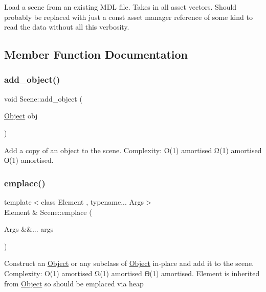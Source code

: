 Load a scene from an existing M\+DL file. Takes in all asset vectors. Should probably be replaced with just a const asset manager reference of some kind to read the data without all this verbosity. 

\subsection{Member Function Documentation}
\mbox{\label{class_scene_a6af6561348957b6ce78e851390bc2d58}} 
\subsubsection{\texorpdfstring{add\+\_\+object()}{add\_object()}}
{\footnotesize\ttfamily void Scene\+::add\+\_\+object (\begin{DoxyParamCaption}\item[{\mbox{\hyperlink{class_object}{Object}}}]{obj }\end{DoxyParamCaption})}

Add a copy of an object to the scene. Complexity\+: O(1) amortised Ω(1) amortised ϴ(1) amortised. \mbox{\label{class_scene_ab49d36bd44583a0374eedf41ccce75d3}} 
\subsubsection{\texorpdfstring{emplace()}{emplace()}}
{\footnotesize\ttfamily template$<$class Element , typename... Args$>$ \\
Element \& Scene\+::emplace (\begin{DoxyParamCaption}\item[{Args \&\&...}]{args }\end{DoxyParamCaption})}

Construct an \mbox{\hyperlink{class_object}{Object}} or any subclass of \mbox{\hyperlink{class_object}{Object}} in-\/place and add it to the scene. Complexity\+: O(1) amortised Ω(1) amortised ϴ(1) amortised. Element is inherited from \mbox{\hyperlink{class_object}{Object}} so should be emplaced via heap \mbox{\label{class_scene_a5875b3cf7be811378d53f0fba76cb181}} 
